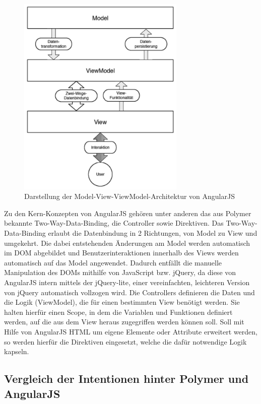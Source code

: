 \begin{figure}[htbp]
 \centering
 \includegraphics[width=8cm]{kapitel7/bilder/1-model-view-viewmodel}
 \caption{Darstellung der Model-View-ViewModel-Architektur von AngularJS}
 \label{fig:ddmvvmavajs}
\end{figure}

Zu den Kern-Konzepten von AngularJS gehören unter anderen das aus Polymer bekannte Two-Way-Data-Binding, die Controller sowie Direktiven. Das Two-Way-Data-Binding erlaubt die Datenbindung in 2 Richtungen, von Model zu View und umgekehrt. Die dabei entstehenden Änderungen am Model werden automatisch im \ac{DOM} abgebildet und Benutzerinteraktionen innerhalb des Views werden automatisch auf das Model angewendet. Dadurch entfällt die manuelle Manipulation des \ac{DOM}s mithilfe von JavaScript bzw. jQuery, da diese von AngularJS intern mittels der jQuery-lite, einer vereinfachten, leichteren Version von jQuery automatisch vollzogen wird. Die Controllers definieren die Daten und die Logik (ViewModel), die für einen bestimmten View benötigt werden. Sie halten hierfür einen Scope, in dem die Variablen und Funktionen definiert werden, auf die aus dem View heraus zugegriffen werden können soll. Soll mit Hilfe von AngularJS \ac{HTML} um eigene Elemente oder Attribute erweitert werden, so werden hierfür die Direktiven eingesetzt, welche die dafür notwendige Logik kapseln.


\subsection{Vergleich der Intentionen hinter Polymer und AngularJS}\label{vergleich-der-intentionen-hinter-polymer-und-angularjs}

